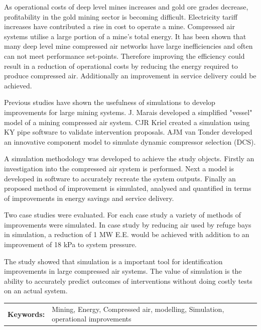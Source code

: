 \documentclass[12pt, english, oneside, open=any]{report}
\begin{document}
	 As operational costs of deep level mines increases and gold ore grades decrease, profitability in the gold mining sector is becoming difficult. Electricity tariff increases have contributed a rise in cost to operate a mine.  Compressed air systems utilise a large portion of a mine's total energy. It has been shown that many deep level mine compressed air networks have large inefficiencies and often can not meet performance set-points. Therefore improving the efficiency could result in a reduction of operational costs by reducing the energy required to produce compressed air. Additionally an improvement in service delivery could be achieved. \par
	Previous studies have shown the usefulness of simulations to develop improvements for large mining systems.  J. Marais developed  a simplified "vessel" model of a mining compressed air system. CJR Kriel created a simulation using KY pipe software to validate intervention proposals. AJM van Tonder developed an innovative component model to simulate dynamic compressor  selection (DCS). \par
	A simulation methodology was developed to achieve the study objects. Firstly an investigation into the compressed air system is performed. Next a model is developed in software to accurately recreate the system outputs. Finally an proposed method of improvement is simulated, analysed and quantified in terms of improvements in energy savings and service delivery.\par
	 Two case studies were evaluated. For each case study a variety of methods of improvements were simulated. In case study by reducing air used by refuge bays in simulation, a reduction of 1 MW E.E. would be achieved with addition to an improvement of 18 kPa to system pressure.\par
	 The study showed that simulation is a important tool for identification improvements in large compressed air systems. The value of simulation is the ability to accurately predict outcomes of interventions without doing costly tests on an actual system. \\
	 \vspace{2cm}
	\begin{tabular}{p{2.35cm}p{13.35cm}}
		\textbf{Keywords:} & Mining, Energy, Compressed air, modelling, Simulation, operational improvements  \\
	\end{tabular}
\clearpage

\setcounter{page}{3}
\begin{spacing}{0.2} 
\tableofcontents
\end{spacing}
\clearpage
\end{document}
